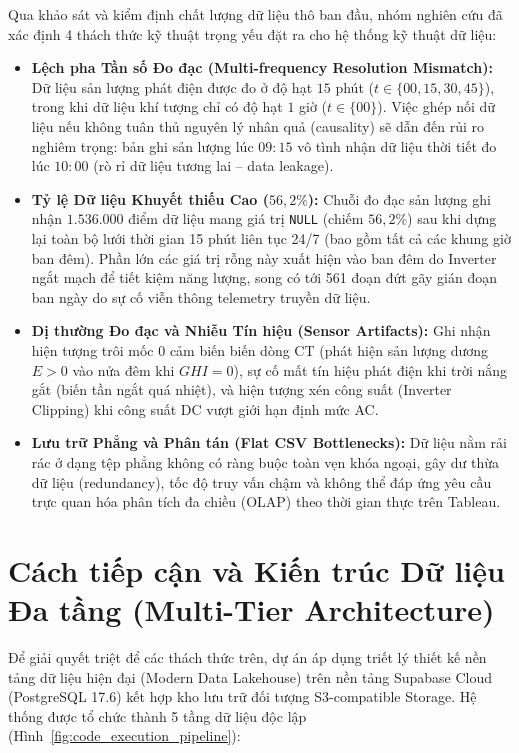 \documentclass[12pt, a4paper]{report}
\begin{document}
Qua khảo sát và kiểm định chất lượng dữ liệu thô ban đầu, nhóm nghiên cứu đã xác định 4 thách thức kỹ thuật trọng yếu đặt ra cho hệ thống kỹ thuật dữ liệu:

\begin{itemize}[leftmargin=*]
    \item \textbf{Lệch pha Tần số Đo đạc (Multi-frequency Resolution Mismatch):} Dữ liệu sản lượng phát điện được đo ở độ hạt $15$ phút ($t \in \{00, 15, 30, 45\}$), trong khi dữ liệu khí tượng chỉ có độ hạt $1$ giờ ($t \in \{00\}$). Việc ghép nối dữ liệu nếu không tuân thủ nguyên lý nhân quả (causality) sẽ dẫn đến rủi ro nghiêm trọng: bản ghi sản lượng lúc $09:15$ vô tình nhận dữ liệu thời tiết đo lúc $10:00$ (rò rỉ dữ liệu tương lai -- data leakage).
    
    \item \textbf{Tỷ lệ Dữ liệu Khuyết thiếu Cao ($56{,}2\%$):} Chuỗi đo đạc sản lượng ghi nhận $1.536.000$ điểm dữ liệu mang giá trị \texttt{NULL} (chiếm $56{,}2\%$) sau khi dựng lại toàn bộ lưới thời gian 15 phút liên tục 24/7 (bao gồm tất cả các khung giờ ban đêm). Phần lớn các giá trị rỗng này xuất hiện vào ban đêm do Inverter ngắt mạch để tiết kiệm năng lượng, song có tới 561 đoạn đứt gãy gián đoạn ban ngày do sự cố viễn thông telemetry truyền dữ liệu.
    
    \item \textbf{Dị thường Đo đạc và Nhiễu Tín hiệu (Sensor Artifacts):} Ghi nhận hiện tượng trôi mốc 0 cảm biến biến dòng CT (phát hiện sản lượng dương $E > 0$ vào nửa đêm khi $GHI = 0$), sự cố mất tín hiệu phát điện khi trời nắng gắt (biến tần ngắt quá nhiệt), và hiện tượng xén công suất (Inverter Clipping) khi công suất DC vượt giới hạn định mức AC.
    
    \item \textbf{Lưu trữ Phẳng và Phân tán (Flat CSV Bottlenecks):} Dữ liệu nằm rải rác ở dạng tệp phẳng không có ràng buộc toàn vẹn khóa ngoại, gây dư thừa dữ liệu (redundancy), tốc độ truy vấn chậm và không thể đáp ứng yêu cầu trực quan hóa phân tích đa chiều (OLAP) theo thời gian thực trên Tableau.
\end{itemize}

\section{Cách tiếp cận và Kiến trúc Dữ liệu Đa tầng (Multi-Tier Architecture)}
\label{sec:multi_tier_arch}

Để giải quyết triệt để các thách thức trên, dự án áp dụng triết lý thiết kế nền tảng dữ liệu hiện đại (Modern Data Lakehouse) trên nền tảng Supabase Cloud (PostgreSQL 17.6) kết hợp kho lưu trữ đối tượng S3-compatible Storage. Hệ thống được tổ chức thành 5 tầng dữ liệu độc lập (Hình~\ref{fig:code_execution_pipeline}):
\end{document}
